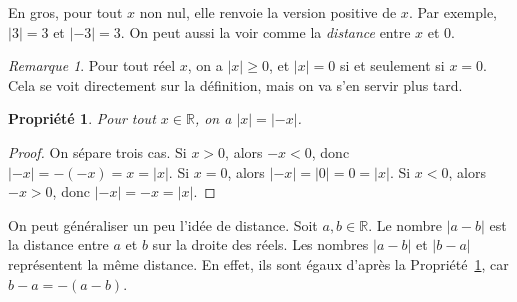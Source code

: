 \documentclass[12pt,a4paper]{article}
\theoremstyle{plain}
\newtheorem{property}[theorem]{Propriété}
\theoremstyle{definition}
\theoremstyle{remark}
\newtheorem*{remark}{Remarque}
\begin{document}
En gros, pour tout $x$ non nul, elle renvoie la version positive de $x$.
Par exemple, $\lvert 3 \rvert = 3$ et $\lvert -3 \rvert = 3$. On peut aussi
la voir comme la \textit{distance} entre $x$ et $0$.

\begin{center}
\end{center}

\begin{remark}
  Pour tout réel $x$, on a $\lvert x \rvert \ge 0$, et $\lvert x \rvert = 0$ si et
  seulement si $x = 0$. Cela se voit directement sur la définition, mais on va
  s'en servir plus tard.
\end{remark}

\begin{tcolorbox}[graybar]
  \begin{property}
    \label{prop:abs_opposite}
    Pour tout $x \in \mathbb{R}$, on a $\lvert x \rvert = \lvert -x \rvert$.
  \end{property}
\end{tcolorbox}

\begin{proof}
  On sépare trois cas. Si $x > 0$, alors $-x < 0$, donc
  $\lvert -x \rvert = -(-x) = x = \lvert x \rvert$.
  Si $x = 0$, alors $\lvert -x \rvert = \lvert 0 \rvert = 0 = \lvert x \rvert$.
  Si $x < 0$, alors $-x > 0$, donc $\lvert -x \rvert = -x = \lvert x \rvert$.
\end{proof}

On peut généraliser un peu l'idée de distance. Soit $a, b \in \mathbb{R}$.
Le nombre $\lvert a - b \rvert$ est la distance entre $a$ et $b$ sur la droite
des réels. Les nombres $\lvert a - b \rvert$ et $\lvert b - a \rvert$ représentent
la même distance. En effet, ils sont égaux d'après la
Propriété~\ref{prop:abs_opposite}, car $b - a = -(a - b)$.
\end{document}
